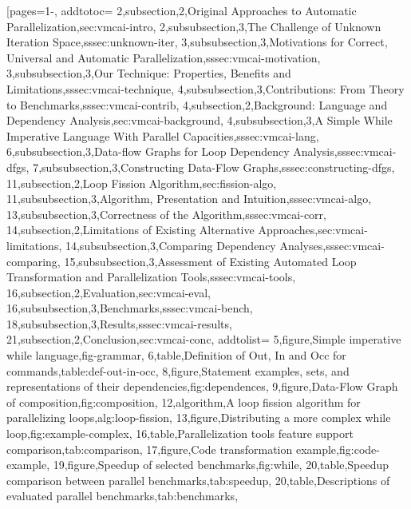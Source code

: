 [pages={1-},
    addtotoc={
        2,subsection,2,{Original Approaches to Automatic Parallelization},sec:vmcai-intro,
        2,subsubsection,3,{The Challenge of Unknown Iteration Space},sssec:unknown-iter,
        3,subsubsection,3,{Motivations for Correct, Universal and Automatic Parallelization},sssec:vmcai-motivation,
        3,subsubsection,3,{Our Technique: Properties, Benefits and Limitations},sssec:vmcai-technique,
        4,subsubsection,3,{Contributions: From Theory to Benchmarks},sssec:vmcai-contrib,
        4,subsection,2,{Background: Language and Dependency Analysis},sec:vmcai-background,
        4,subsubsection,3,{A Simple While Imperative Language With Parallel Capacities},sssec:vmcai-lang,
        6,subsubsection,3,{Data-flow Graphs for Loop Dependency Analysis},sssec:vmcai-dfgs,
        7,subsubsection,3,{Constructing Data-Flow Graphs},sssec:constructing-dfgs,
        11,subsection,2,{Loop Fission Algorithm},sec:fission-algo,
        11,subsubsection,3,{Algorithm, Presentation and Intuition},sssec:vmcai-algo,
        13,subsubsection,3,{Correctness of the Algorithm},sssec:vmcai-corr,
        14,subsection,2,{Limitations of Existing Alternative Approaches},sec:vmcai-limitations,
        14,subsubsection,3,{Comparing Dependency Analyses},sssec:vmcai-comparing,
        15,subsubsection,3,{Assessment of Existing Automated Loop Transformation and Parallelization Tools},sssec:vmcai-tools,
        16,subsection,2,{Evaluation},sec:vmcai-eval,
        16,subsubsection,3,{Benchmarks},sssec:vmcai-bench,
        18,subsubsection,3,{Results},sssec:vmcai-results,
        21,subsection,2,{Conclusion},sec:vmcai-conc},
    addtolist={
        5,figure,{Simple imperative while language},fig-grammar,
        6,table,{Definition of Out, In and Occ for commands},table:def-out-in-occ,
        8,figure,{Statement examples, sets, and representations of their dependencies},fig:dependences,
        9,figure,{Data-Flow Graph of composition},fig:composition,
        12,algorithm,{A loop fission algorithm for parallelizing loops},alg:loop-fission,
        13,figure,{Distributing a more complex while loop},fig:example-complex,
        16,table,{Parallelization tools feature support comparison},tab:comparison,
        17,figure,{Code transformation example},fig:code-example,
        19,figure,{Speedup of selected benchmarks},fig:while,
        20,table,{Speedup comparison between parallel benchmarks},tab:speedup,
        20,table,{Descriptions of evaluated parallel benchmarks},tab:benchmarks},
